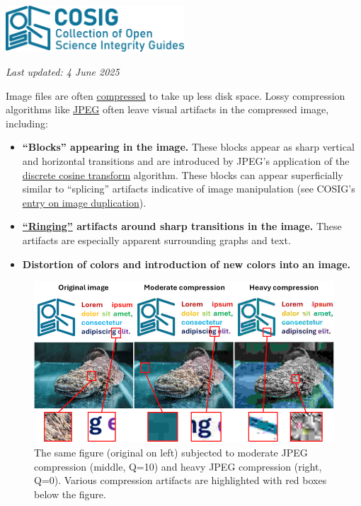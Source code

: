 \documentclass[letterpaper, 12pt]{article}
\begin{document}
\flushleft\includegraphics[width=0.5\textwidth]{img/home/241017_final_logo_mockup.png}

\textit{Last updated: 4 June 2025}

Image files are often \href{https://en.wikipedia.org/wiki/Data_compression}{compressed} to take up less disk space. Lossy compression algorithms like \href{https://en.wikipedia.org/wiki/JPEG}{JPEG} often leave visual artifacts in the compressed image, including:

\begin{itemize}
    \setlength\itemsep{-0.5em}
    \item \textbf{``Blocks'' appearing in the image.} These blocks appear as sharp vertical and horizontal transitions and are introduced by JPEG's application of the \href{https://en.wikipedia.org/wiki/Discrete_cosine_transform}{discrete cosine transform} algorithm. These blocks can appear superficially similar to ``splicing'' artifacts indicative of image manipulation (see COSIG's \href{https://osf.io/547re}{entry on image duplication}).
    \item \textbf{\href{https://en.wikipedia.org/wiki/Ringing_artifacts}{``Ringing''} artifacts around sharp transitions in the image.} These artifacts are especially apparent surrounding graphs and text.
    \item \textbf{Distortion of colors and introduction of new colors into an image.}
\end{itemize}

\begin{figure}[h!tbp]
    \centering
    \includegraphics[width=\textwidth]{img/compression_artifacts/image_compression_fig_small.png}
    \caption*{The same figure (original on left) subjected to moderate JPEG compression (middle, Q=10) and heavy JPEG compression (right, Q=0). Various compression artifacts are highlighted with red boxes below the figure.}
\end{figure}
\end{document}

